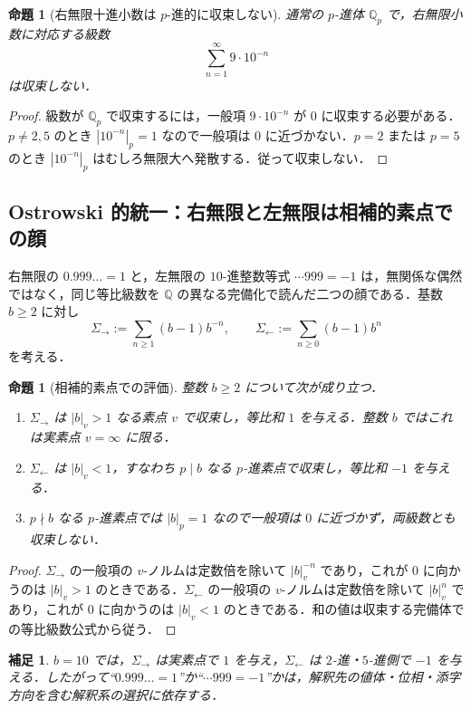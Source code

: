 \documentclass[a4paper,11pt]{ltjsarticle}
\theoremstyle{jpdef}
\newtheorem{remark}[definition]{補足}
\theoremstyle{jpthm}
\newtheorem{proposition}[definition]{命題}
\newcommand{\Q}{\mathbb{Q}}
\begin{document}
\begin{proposition}[右無限十進小数は \(p\)-進的に収束しない]
通常の \(p\)-進体 \(\Q_p\) で，右無限小数に対応する級数
\[
  \sum_{n=1}^{\infty}9\cdot10^{-n}
\]
は収束しない．
\end{proposition}

\begin{proof}
級数が \(\Q_p\) で収束するには，一般項 \(9\cdot10^{-n}\) が \(0\) に収束する必要がある．\(p\ne2,5\) のとき \(|10^{-n}|_p=1\) なので一般項は \(0\) に近づかない．\(p=2\) または \(p=5\) のとき \(|10^{-n}|_p\) はむしろ無限大へ発散する．従って収束しない．
\end{proof}

\subsection{Ostrowski 的統一：右無限と左無限は相補的素点での顔}

右無限の \(0.999\ldots=1\) と，左無限の \(10\)-進整数等式 \(\cdots999=-1\) は，無関係な偶然ではなく，同じ等比級数を \(\Q\) の異なる完備化で読んだ二つの顔である．基数 \(b\ge2\) に対し
\[
  \Sigma_{\to}:=\sum_{n\ge1}(b-1)b^{-n},
  \qquad
  \Sigma_{\leftarrow}:=\sum_{n\ge0}(b-1)b^n
\]
を考える．

\begin{proposition}[相補的素点での評価]
整数 \(b\ge2\) について次が成り立つ．
\begin{enumerate}
\item \(\Sigma_{\to}\) は \(|b|_v>1\) なる素点 \(v\) で収束し，等比和 \(1\) を与える．整数 \(b\) ではこれは実素点 \(v=\infty\) に限る．
\item \(\Sigma_{\leftarrow}\) は \(|b|_v<1\)，すなわち \(p\mid b\) なる \(p\)-進素点で収束し，等比和 \(-1\) を与える．
\item \(p\nmid b\) なる \(p\)-進素点では \(|b|_p=1\) なので一般項は \(0\) に近づかず，両級数とも収束しない．
\end{enumerate}
\end{proposition}

\begin{proof}
\(\Sigma_{\to}\) の一般項の \(v\)-ノルムは定数倍を除いて \(|b|_v^{-n}\) であり，これが \(0\) に向かうのは \(|b|_v>1\) のときである．\(\Sigma_{\leftarrow}\) の一般項の \(v\)-ノルムは定数倍を除いて \(|b|_v^n\) であり，これが \(0\) に向かうのは \(|b|_v<1\) のときである．和の値は収束する完備体での等比級数公式から従う．
\end{proof}

\begin{remark}
\(b=10\) では，\(\Sigma_{\to}\) は実素点で \(1\) を与え，\(\Sigma_{\leftarrow}\) は \(2\)-進・\(5\)-進側で \(-1\) を与える．したがって``\(0.999\ldots=1\)''か``\(\cdots999=-1\)''かは，解釈先の値体・位相・添字方向を含む解釈系の選択に依存する．
\end{remark}
\end{document}
